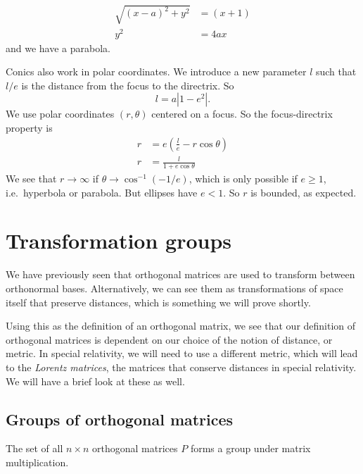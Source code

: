 \documentclass[a4paper]{article}
\begin{document}
\begin{enumerate}
\begin{center}
    \end{center}
    \begin{align*}
      \sqrt{(x - a)^2 + y^2} &= (x + 1)\\
      y^2 &= 4ax
    \end{align*}
    and we have a parabola.
\end{enumerate}

Conics also work in polar coordinates. We introduce a new parameter $l$ such that $l/e$ is the distance from the focus to the directrix. So
\[
  l = a|1 - e^2|.
\]
We use polar coordinates $(r, \theta)$ centered on a focus. So the focus-directrix property is
\begin{align*}
  r &= e\left(\frac{l}{e} - r\cos\theta\right)\\
  r &= \frac{l}{1 + e\cos\theta}
\end{align*}
We see that $r\to \infty$ if $\theta \to \cos^{-1}(-1/e)$, which is only possible if $e\geq 1$, i.e.\ hyperbola or parabola. But ellipses have $e < 1$. So $r$ is bounded, as expected.

\section{Transformation groups}
We have previously seen that orthogonal matrices are used to transform between orthonormal bases. Alternatively, we can see them as transformations of space itself that preserve distances, which is something we will prove shortly.

Using this as the definition of an orthogonal matrix, we see that our definition of orthogonal matrices is dependent on our choice of the notion of distance, or metric. In special relativity, we will need to use a different metric, which will lead to the \emph{Lorentz matrices}, the matrices that conserve distances in special relativity. We will have a brief look at these as well.

\subsection{Groups of orthogonal matrices}
\begin{prop}
  The set of all $n\times n$ orthogonal matrices $P$ forms a group under matrix multiplication.
\end{prop}
\end{document}
